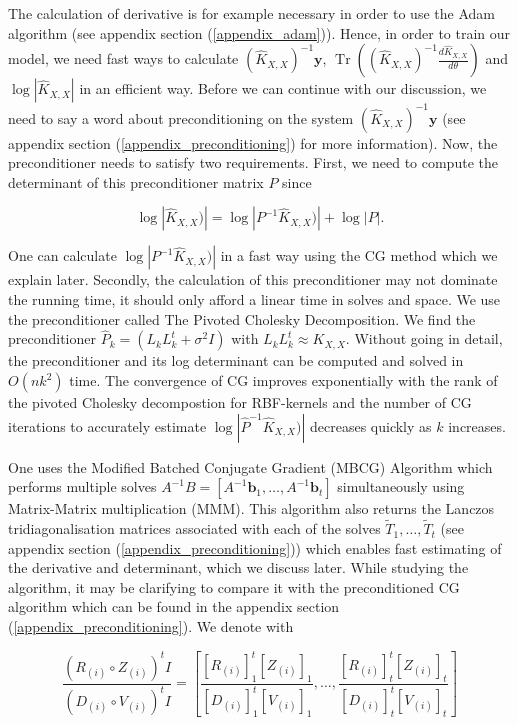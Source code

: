 \documentclass[12pt,a4paper,oneside]{book}
\DeclareMathOperator{\Tr}{Tr}
\begin{document}
The calculation of derivative is for example necessary in order to use the Adam algorithm (see appendix section (\ref{appendix_adam})). Hence, in order to train our model, we need fast ways to calculate $(\hat{K}_{X,X})^{-1} \bm{y}$, $\Tr \left( (\hat{K}_{X,X})^{-1} \frac{d \hat{K}_{X,X}}{d \theta} \right)$ and $\log |\hat{K}_{X,X}|$ in an efficient way. Before we can continue with our discussion, we need to say a word about preconditioning on the system $(\hat{K}_{X,X})^{-1} \bm{y}$   (see appendix section (\ref{appendix_preconditioning}) for more information). Now, the preconditioner needs to satisfy two requirements. First, we need to compute the determinant of this preconditioner matrix $P$ since 

\begin{equation}
\log | \hat{K}_{X,X}) | = \log | P^{-1} \hat{K}_{X,X}) | + \log |P|.
\end{equation}

One can calculate $\log | P^{-1} \hat{K}_{X,X}) |$ in a fast way using the CG method which we explain later. Secondly, the calculation of this preconditioner may not dominate the running time, it should only afford a linear time in solves and space. We use the preconditioner called The Pivoted Cholesky Decomposition. We find the preconditioner $\hat{P}_k = (L_k L_k^t + \sigma^2 I)$ with $L_k L_k^t \approx K_{X,X}$. Without going in detail, the preconditioner and its log determinant can be computed and solved in $O(nk^2)$ time. The convergence of CG improves exponentially with the rank of the pivoted Cholesky decompostion for RBF-kernels and the number of CG iterations to accurately estimate $\log | \hat{P}^{-1} \hat{K}_{X,X}) |$ decreases quickly as $k$ increases. 

One uses the Modified Batched Conjugate Gradient (MBCG) Algorithm which performs multiple solves $A^{-1} B = [ A^{-1} \bm{b}_1 , \ldots, A^{-1} \bm{b}_t]$ simultaneously using Matrix-Matrix multiplication (MMM). This algorithm also returns the Lanczos tridiagonalisation matrices associated with each of the solves $\tilde{T}_1, \ldots, \tilde{T}_t$ (see appendix section (\ref{appendix_preconditioning})) which enables fast estimating of the derivative and determinant, which we discuss later. While studying the algorithm, it may be clarifying to compare it with the preconditioned CG algorithm which can be found in the appendix section (\ref{appendix_preconditioning}). We denote with 

\begin{equation}
\dfrac{(R_{(i)} \circ Z_{(i)})^t I}{(D_{(i)} \circ V_{(i)})^t I} =  \left[\dfrac{[R_{(i)}]_1^t [Z_{(i)}]_1 }{[D_{(i)}]_1^t  [V_{(i)}]_1}, \ldots, \dfrac{[R_{(i)}]_t^t [Z_{(i)}]_t }{[D_{(i)}]_t^t  [V_{(i)}]_t} \right]
\end{equation}
\end{document}
